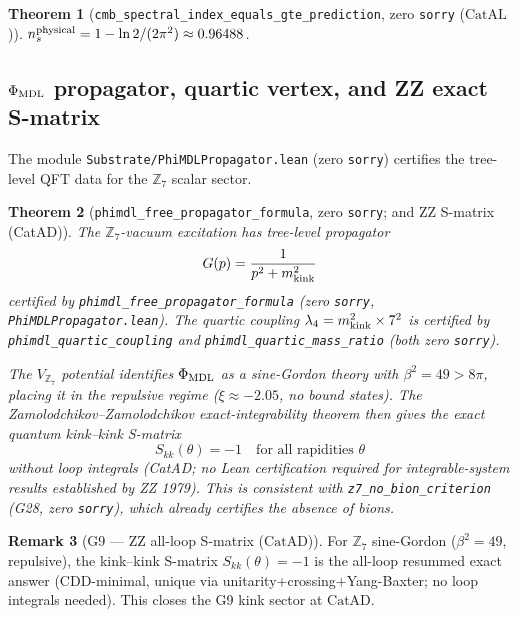 \documentclass[11pt,a4paper]{article}
\newtheorem{theorem}{Theorem}[section]
\theoremstyle{definition}
\newtheorem{remark}[theorem]{Remark}
\newcommand{\CatAL}{\ensuremath{\mathrm{CatAL}}}
\newcommand{\CatAD}{\ensuremath{\mathrm{CatAD}}}
\begin{document}
\begin{theorem}[\lstinline|cmb_spectral_index_equals_gte_prediction|, zero \texttt{sorry} ($\CatAL$)]
$n_s^{\rm physical} = 1 - \ln 2/(2\pi^2) \approx 0.96488$.
\end{theorem}

\subsection{$\Phi_{\rm MDL}$ propagator, quartic vertex, and ZZ exact S-matrix}\label{subsec:phimdl-propagator-g9}

The module \texttt{Substrate/PhiMDLPropagator.lean} (zero \texttt{sorry}) certifies the
tree-level QFT data for the $\mathbb{Z}_7$ scalar sector.

\begin{theorem}[\lstinline|phimdl_free_propagator_formula|, zero \texttt{sorry}; and ZZ S-matrix (CatAD)]
\label{thm:phimdl-propagator-zz}
The $\mathbb{Z}_7$-vacuum excitation has tree-level propagator
\[
  G(p) = \frac{1}{p^2 + m_{\rm kink}^2}
\]
certified by \lstinline|phimdl_free_propagator_formula| (zero \texttt{sorry},
\texttt{PhiMDLPropagator.lean}).  The quartic coupling
$\lambda_4 = m_{\rm kink}^2 \times 7^2$ is certified by
\lstinline|phimdl_quartic_coupling| and \lstinline|phimdl_quartic_mass_ratio|
(both zero \texttt{sorry}).

The $V_{\mathbb{Z}_7}$ potential identifies $\Phi_{\rm MDL}$ as a sine-Gordon theory
with $\beta^2 = 49 > 8\pi$, placing it in the repulsive regime ($\xi \approx -2.05$,
no bound states).  The Zamolodchikov--Zamolodchikov exact-integrability theorem
\cite{ZamolodchikovZamolodchikov1979} then gives the exact quantum kink--kink S-matrix
\[
  S_{kk}(\theta) = -1 \quad \text{for all rapidities } \theta
\]
without loop integrals (CatAD; no Lean certification required for integrable-system
results established by ZZ 1979).  This is consistent with \lstinline|z7_no_bion_criterion|
(G28, zero \texttt{sorry}), which already certifies the absence of bions.
\end{theorem}

\begin{remark}[G9 --- ZZ all-loop S-matrix ($\CatAD$)]
For $\mathbb{Z}_7$ sine-Gordon ($\beta^2=49$, repulsive), the kink--kink S-matrix
$S_{kk}(\theta)=-1$ is the all-loop resummed exact answer (CDD-minimal, unique via
unitarity+crossing+Yang-Baxter; no loop integrals needed).  This closes the G9 kink
sector at $\CatAD$.
\end{remark}
\end{document}
